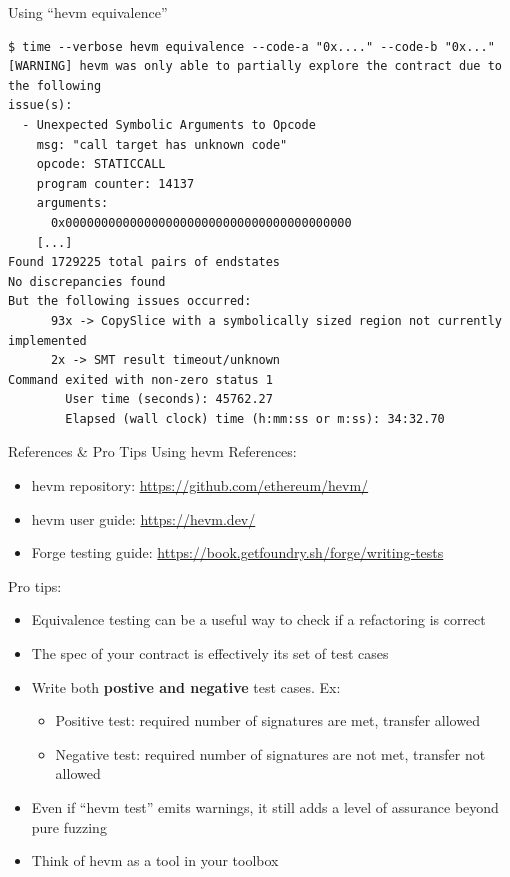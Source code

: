\documentclass[aspectratio=169]{beamer}
\begin{document}
\begin{frame}[fragile=singleslide]{Using ``hevm equivalence''}
\begin{Verbatim}[frame=single, framerule=0.2mm, framesep=2mm,fontsize=\footnotesize]
$ time --verbose hevm equivalence --code-a "0x...." --code-b "0x..."
[WARNING] hevm was only able to partially explore the contract due to the following
issue(s):
  - Unexpected Symbolic Arguments to Opcode
    msg: "call target has unknown code"
    opcode: STATICCALL
    program counter: 14137
    arguments:
      0x0000000000000000000000000000000000000000
    [...]
Found 1729225 total pairs of endstates
No discrepancies found
But the following issues occurred:
      93x -> CopySlice with a symbolically sized region not currently implemented
      2x -> SMT result timeout/unknown
Command exited with non-zero status 1
        User time (seconds): 45762.27
        Elapsed (wall clock) time (h:mm:ss or m:ss): 34:32.70
\end{Verbatim}
\end{frame}

\begin{frame}[fragile=singleslide]{References \& Pro Tips Using hevm}
References:
\begin{itemize}
    \item hevm repository: \url{https://github.com/ethereum/hevm/}
    \item hevm user guide: \url{https://hevm.dev/}
    \item Forge testing guide: \url{https://book.getfoundry.sh/forge/writing-tests}
\end{itemize}

\bigskip

Pro tips:
\begin{itemize}
    \item Equivalence testing can be a useful way to check if a refactoring is correct
    \item The spec of your contract is effectively its set of test cases
    \item Write both \textbf{postive and negative} test cases. Ex:
        \begin{itemize}
            \item Positive test: required number of signatures are met, transfer allowed
            \item Negative test: required number of signatures are not met, transfer not allowed
        \end{itemize}
    \item Even if ``hevm test'' emits warnings, it still adds a level of assurance beyond pure fuzzing
    \item Think of hevm as a tool in your toolbox
\end{itemize}


\end{frame}
\end{document}
